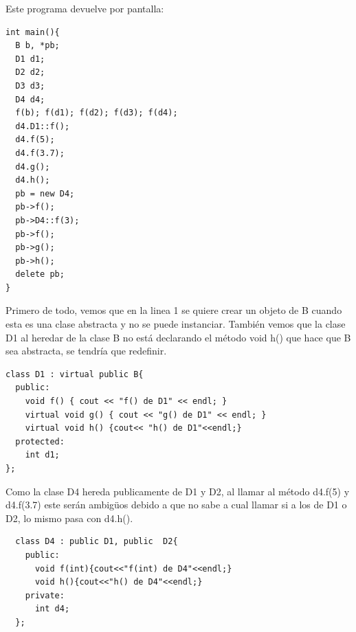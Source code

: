 \newpage
Este programa devuelve por pantalla:
\begin{center}
  \begin{lstlisting}[frame = single]
int main(){
  B b, *pb;
  D1 d1; 
  D2 d2;
  D3 d3;
  D4 d4;
  f(b); f(d1); f(d2); f(d3); f(d4);
  d4.D1::f();
  d4.f(5);
  d4.f(3.7);
  d4.g();
  d4.h();
  pb = new D4;
  pb->f();
  pb->D4::f(3);
  pb->f();
  pb->g();
  pb->h();
  delete pb;
}
  \end{lstlisting}
\end{center}

Primero de todo, vemos que en la linea 1 se quiere crear un objeto de B cuando esta es una clase abstracta y no se puede instanciar.
También vemos que la clase D1 al heredar de la clase B no está declarando el método void h() que hace que B sea abstracta, se tendría que redefinir.

\begin{verbatim}
class D1 : virtual public B{
  public:
    void f() { cout << "f() de D1" << endl; }
    virtual void g() { cout << "g() de D1" << endl; }
    virtual void h() {cout<< "h() de D1"<<endl;}
  protected:
    int d1;
};
\end{verbatim}

Como la clase D4 hereda publicamente de D1 y D2, al llamar al método d4.f(5) y d4.f(3.7) este serán ambigüos debido a que no sabe a cual llamar si a los de D1 o D2, lo mismo pasa con d4.h().

\begin{verbatim}
  class D4 : public D1, public  D2{
    public:
      void f(int){cout<<"f(int) de D4"<<endl;}
      void h(){cout<<"h() de D4"<<endl;}
    private:
      int d4;
  };
  \end{verbatim}
  
